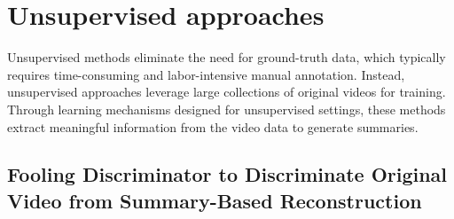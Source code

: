 \section{Unsupervised approaches} 
\label{section:rel-unsupervised} 

Unsupervised methods eliminate the need for ground-truth data, which typically requires time-consuming and labor-intensive manual annotation. Instead, unsupervised approaches leverage large collections of original videos for training. Through learning mechanisms designed for unsupervised settings, these methods extract meaningful information from the video data to generate summaries.

\subsection{Fooling Discriminator to Discriminate Original Video from Summary-Based Reconstruction}
\label{section:rel-unsup-discriminative}



